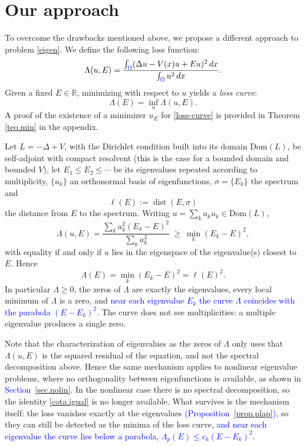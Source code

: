 \documentclass[10pt]{amsart}
\newcommand{\rev}[1]{\textcolor{blue}{#1}}
\newenvironment{revblock}{\color{blue}}{}
\theoremstyle{definition}
\theoremstyle{remark}
\theoremstyle{plain}
\newcommand{\R}{\mathbb{R}}
\DeclareMathOperator{\dist}{dist}
\begin{document}
\section{Our approach}\label{sec.approach}

To overcome the drawbacks mentioned above, we propose a different approach to problem \eqref{eigen}. We define the following loss function:
\begin{equation}\label{Lambda}
\Lambda(u, E) = \frac{\int_{\rev{\Omega}} (\Delta u - V(x) u + Eu)^2\, dx}{\int_{\rev{\Omega}} u^2\, dx}.
\end{equation}
Given a fixed $E\in \R$, minimizing with respect to $u$ yields a {\em loss curve}:
\begin{equation}\label{loss-curve}
\Lambda(E) = \inf_u \Lambda(u, E).
\end{equation}
A proof of the existence of a minimizer $u_E$ for \eqref{loss-curve} is provided in Theorem \ref{teo.min} in the appendix.

\begin{revblock}
Let $L=-\Delta+V$, with the Dirichlet condition built into its domain $\mathrm{Dom}(L)$, be self-adjoint with
compact resolvent (this is the case for a bounded domain and bounded $V$), let
$E_1\le E_2\le\cdots$ be its eigenvalues repeated according to multiplicity, $\{u_k\}$ an orthonormal
basis of eigenfunctions, $\sigma=\{E_k\}$ the spectrum and
\[
\ell(E):=\dist(E,\sigma)
\]
the distance from $E$ to the spectrum. Writing
$u=\sum_ka_ku_k\in \mathrm{Dom}(L)$,
\[
\Lambda(u,E)=\frac{\sum_k a_k^2 (E_k-E)^2}{\sum_k a_k^2}\ \ge\ \min_k (E_k-E)^2,
\]
with equality if and only if $u$ lies in the eigenspace of the eigenvalue(s) closest to $E$. Hence
\begin{equation} \label{cota.igual}
\Lambda(E)=\min_k (E_k-E)^2=\ell(E)^2 .
\end{equation}
In particular $\Lambda\ge0$, the zeros of $\Lambda$ are exactly the eigenvalues, every local minimum
of $\Lambda$ is a zero, and \rev{near each eigenvalue $E_k$ the curve $\Lambda$ coincides with the parabola $(E-E_k)^2$}. The
curve does not see multiplicities: a multiple eigenvalue produces a single zero.
\end{revblock}

Note that the characterization of eigenvalues as the zeros of $\Lambda$ only uses that
$\Lambda(u,E)$ is the squared residual of the equation, and not the spectral decomposition
above. Hence the same mechanism applies to nonlinear eigenvalue problems, where no
orthogonality between eigenfunctions is available, as shown in \rev{Section~\ref{sec.nolin}}. In the nonlinear case there is no spectral decomposition, so the identity
\eqref{cota.igual} is no longer available. What survives is the mechanism
itself: the loss vanishes exactly at the eigenvalues \rev{(Proposition~\ref{prop.plap})}, so they can still be
detected as the minima of the loss curve\rev{, and near each eigenvalue the curve lies below a parabola,
$\Lambda_p(E)\le c_k(E-E_k)^2$}.
\end{document}
